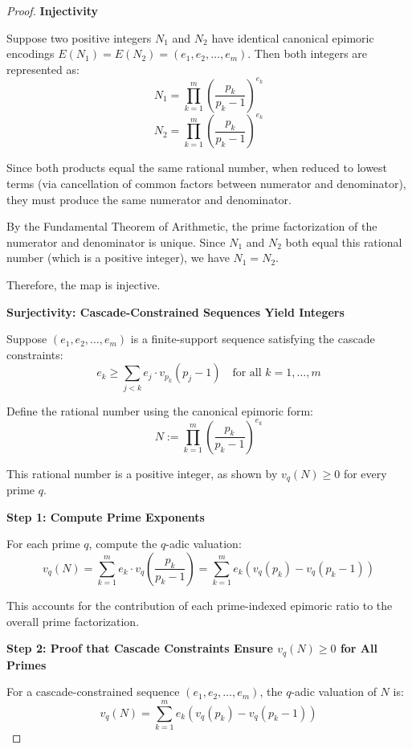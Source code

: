 \begin{proof}

\noindent \textbf{Injectivity}

Suppose two positive integers $N_1$ and $N_2$ have identical canonical epimoric encodings $E(N_1) = E(N_2) = (e_1, e_2, \ldots, e_m)$. Then both integers are represented as:
\[
N_1 = \prod_{k=1}^m \left(\frac{p_k}{p_k - 1}\right)^{e_k}
\]
\[
N_2 = \prod_{k=1}^m \left(\frac{p_k}{p_k - 1}\right)^{e_k}
\]

Since both products equal the same rational number, when reduced to lowest terms (via cancellation of common factors between numerator and denominator), they must produce the same numerator and denominator.

By the Fundamental Theorem of Arithmetic, the prime factorization of the numerator and denominator is unique. Since $N_1$ and $N_2$ both equal this rational number (which is a positive integer), we have $N_1 = N_2$.

Therefore, the map is injective.

\noindent \textbf{Surjectivity: Cascade-Constrained Sequences Yield Integers}

Suppose $(e_1, e_2, \ldots, e_m)$ is a finite-support sequence satisfying the cascade constraints:
\begin{equation}
e_k \geq \sum_{j < k} e_j \cdot v_{p_k}(p_j - 1) \quad \text{for all } k = 1, \ldots, m
\end{equation}

Define the rational number using the canonical epimoric form:
\[
N := \prod_{k=1}^m \left(\frac{p_k}{p_k - 1}\right)^{e_k}
\]

This rational number is a positive integer, as shown by $v_q(N) \geq 0$ for every prime $q$.

\noindent \textbf{Step 1: Compute Prime Exponents}

For each prime $q$, compute the $q$-adic valuation:
\[
v_q(N) = \sum_{k=1}^m e_k \cdot v_q\left(\frac{p_k}{p_k - 1}\right) = \sum_{k=1}^m e_k (v_q(p_k) - v_q(p_k - 1))
\]

This accounts for the contribution of each prime-indexed epimoric ratio to the overall prime factorization.

\noindent \textbf{Step 2: Proof that Cascade Constraints Ensure $v_q(N) \geq 0$ for All Primes}

For a cascade-constrained sequence $(e_1, e_2, \ldots, e_m)$, the $q$-adic valuation of $N$ is:
\begin{equation}
v_q(N) = \sum_{k=1}^m e_k (v_q(p_k) - v_q(p_k - 1))
\end{equation}


\end{proof}
